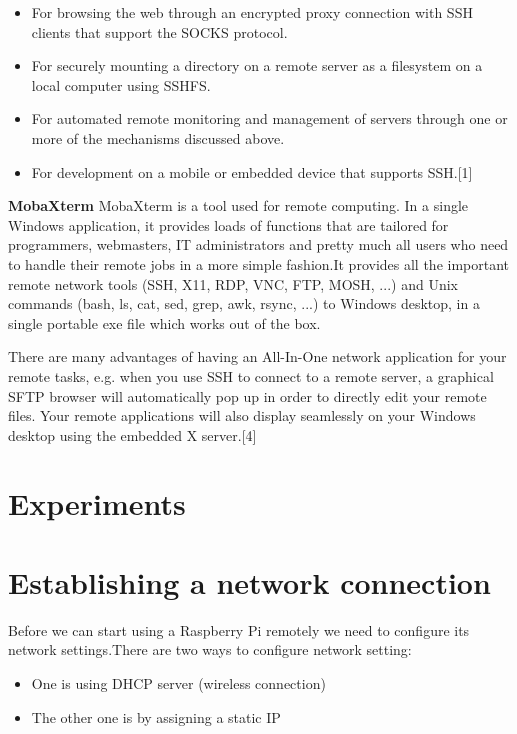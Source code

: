 \documentclass[11pt,a4paper]{report}
\begin{document}
\begin{flushleft}
\begin{itemize}
		\item For browsing the web through an encrypted proxy connection with SSH clients that support the SOCKS protocol.
		\item For securely mounting a directory on a remote server as a filesystem on a local computer using SSHFS.
		\item For automated remote monitoring and management of servers through one or more of the mechanisms discussed above.
		\item For development on a mobile or embedded device that supports SSH.[1]
	\end{itemize}
	
	\flushleft
	\textbf{MobaXterm}
	\vspace{0.4cm}
	\newline MobaXterm is a tool used for remote computing. In a single Windows application, it provides loads of functions that are tailored for programmers, webmasters, IT administrators and pretty much all users who need to handle their remote jobs in a more simple fashion.It provides all the important remote network tools (SSH, X11, RDP, VNC, FTP, MOSH, ...) and Unix commands (bash, ls, cat, sed, grep, awk, rsync, ...) to Windows desktop, in a single portable exe file which works out of the box. \newline
	
	There are many advantages of having an All-In-One network application for your remote tasks, e.g. when you use SSH to connect to a remote server, a graphical SFTP browser will automatically pop up in order to directly edit your remote files. Your remote applications will also display seamlessly on your Windows desktop using the embedded X server.[4]
		
	\newpage
	\section{Experiments}
	
	\section{Establishing a network connection}
	Before we can start using a Raspberry Pi remotely we need to configure its network settings.There are two ways to configure network setting:
	\begin{itemize}
		\item One is using DHCP server (wireless connection)
		\item The other one is by assigning a static IP
	\end{itemize}

\end{flushleft}
\end{document}
